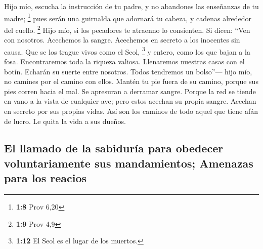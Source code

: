 \begin{paracol}{2}
 Hijo mío, escucha la instrucción de tu padre, y no
abandones las enseñanzas de tu madre; \footnote{\textbf{1:8} Prov 6,20}
 pues serán una guirnalda que adornará tu cabeza, y
cadenas alrededor del cuello. \footnote{\textbf{1:9} Prov 4,9}
 Hijo mío, si los pecadores te atraenno lo consienten.
 Si dicen: ``Ven con nosotros. Acechemos la sangre.
Acechemos en secreto a los inocentes sin causa.  Que se
los trague vivos como el Seol, \footnote{\textbf{1:12} El Seol es el
  lugar de los muertos.} y entero, como los que bajan a la fosa.
 Encontraremos toda la riqueza valiosa. Llenaremos
nuestras casas con el botín.  Echarán su suerte entre
nosotros. Todos tendremos un bolso''---  hijo mío, no
camines por el camino con ellos. Mantén tu pie fuera de su camino,
 porque sus pies corren hacia el mal. Se apresuran a
derramar sangre.  Porque la red se tiende en vano a la
vista de cualquier ave;  pero estos acechan su propia
sangre. Acechan en secreto por sus propias vidas.  Así
son los caminos de todo aquel que tiene afán de lucro. Le quita la vida
a sus dueños.

\hypertarget{el-llamado-de-la-sabiduruxeda-para-obedecer-voluntariamente-sus-mandamientos-amenazas-para-los-reacios}{%
\subsection{El llamado de la sabiduría para obedecer voluntariamente sus
mandamientos; Amenazas para los
reacios}\label{el-llamado-de-la-sabiduruxeda-para-obedecer-voluntariamente-sus-mandamientos-amenazas-para-los-reacios}}


\end{paracol}

